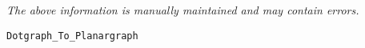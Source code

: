 \label{pkg:dotgraph\_to\_planargraph}

{\tiny \it The above information is manually maintained and may contain errors.}
\begin{verbatim}
Dotgraph_To_Planargraph
\end{verbatim}
